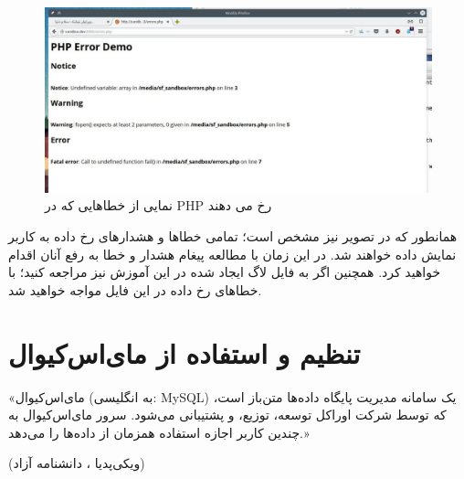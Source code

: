 \begin{figure}
    \includegraphics[width=.9\textwidth ,height=.45\textwidth]{Pic/PHP2}
    \caption{ نمایی از خطاهایی که در PHP رخ می دهند}
    \label{UbuntuServer-PHP-Error}
\end{figure}

همانطور که در تصویر نیز مشخص است؛ تمامی خطاها و هشدارهای رخ داده به کاربر نمایش داده خواهند شد. در این زمان با مطالعه پیغام هشدار و خطا به رفع آنان اقدام خواهید کرد. همچنین اگر به فایل لاگ ایجاد شده در این آموزش نیز مراجعه کنید؛ با خطاهای رخ داده در این فایل مواجه خواهید شد.
\newline
\begin{latin}  
    
\end{latin}
    
 \section{ تنظیم و استفاده از مای‌اس‌کیوال}
 «مای‌اس‌کیوال (به انگلیسی: MySQL) یک سامانه مدیریت پایگاه داده‌ها متن‌باز است، که توسط شرکت اوراکل توسعه، توزیع، و پشتیبانی می‌شود.
 سرور مای‌اس‌کیوال به چندین کاربر اجازه استفاده همزمان از داده‌ها را می‌دهد.» 
 
\begin{flushleft}
     (ویکی‌پدیا ، دانشنامه آزاد)
\end{flushleft}
 
